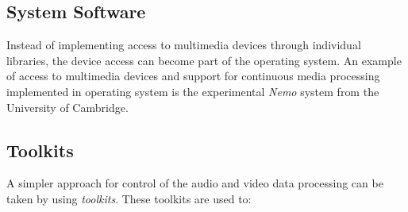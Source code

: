\subsection{System Software}
Instead of implementing access to multimedia devices through individual libraries, the device access can become part of the operating system. An example of access to multimedia devices and support for continuous media processing implemented in operating system is the experimental \textit{Nemo} system from the University of Cambridge. 

	


\subsection{Toolkits}
A simpler approach for control of the audio and video data processing can be taken by using \textit{toolkits}. These toolkits are used to:

